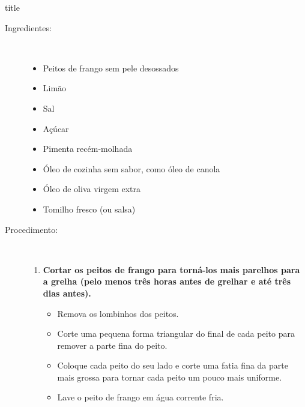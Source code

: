 \documentclass [11pt, letterpaper] {article}
\begin{document}
 {title}

\begin {description}

\item [Ingredientes:] \ \\
\begin {itemize}
\item Peitos de frango sem pele desossados
\item Limão
\item Sal
\item Açúcar
\item Pimenta recém-molhada
\item Óleo de cozinha sem sabor, como óleo de canola
\item Óleo de oliva virgem extra
\item Tomilho fresco (ou salsa)
\end {itemize}

\item [Procedimento:] \ \\
\begin {enumerate}
\item {\bf Cortar os peitos de frango para torná-los mais parelhos para a grelha (pelo menos três horas antes de grelhar e até três dias antes).}
\begin {itemize}
\item Remova os lombinhos dos peitos.
\item Corte uma pequena forma triangular do final de cada peito para remover a parte fina do peito.
\item Coloque cada peito do seu lado e corte uma fatia fina da parte mais grossa para tornar cada peito um pouco mais uniforme.
\item Lave o peito de frango em água corrente fria.
\end {itemize}


\end{enumerate}
\end{description}
\end{document}
